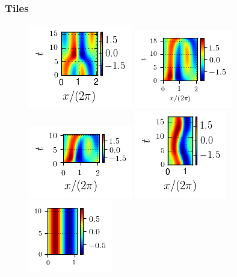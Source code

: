 \documentclass[mathserif, handout]{beamer}
\begin{document}
\begin{frame}%
  \frametitle{Tiles}
  \begin{figure}
  \includegraphics[width=.2\textwidth]{MNG_defect_final}
  \includegraphics[width=.2\textwidth]{MNG_half_final}
  \includegraphics[width=.2\textwidth]{MNG_hook_final}
  \includegraphics[width=.2\textwidth]{MNG_gap_final}
  \includegraphics[width=.2\textwidth]{MNG_streak_final}
  \end{figure}
\end{frame}

\end{document}
